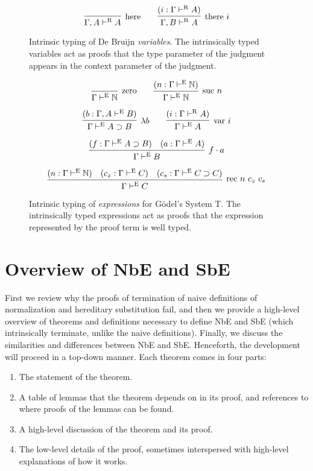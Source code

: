 \documentclass[runningheads,a4paper]{llncs}
\def\arr{\supset}
\def\app{\cdot}
\def\lam{\lambda}
\def\nat{\mathbb{N}}
\newcommand{\turn}[1]{\vdash^\con{#1}}
\newcommand{\con}[1]{\textmd{#1}}
\newcommand{\fun}[1]{\textmd{#1}}
\newcommand{\type}[1]{\Gamma \turn{E} #1}
\newcommand{\ctype}[2]{\Gamma , #1 \turn{E} #2}
\newcommand{\typr}[1]{\Gamma \turn{R} #1}
\newcommand{\ctypr}[2]{\Gamma , #1 \turn{R} #2}
\begin{document}
\begin{figure}[t!]
\caption{
Intrinsic typing of De Bruijn \textit{variables}.
The intrinsically typed variables act as proofs that the type
parameter of the judgment appears in the context parameter of the
judgment.
}
$$
\infer
  [\con{here}]
  {\ctypr{A}{A}}
{
}
\qquad
\infer
  [\con{there} ~ i]
  {\ctypr{B}{A}}
{
  (i : \typr{A})
}
$$
\label{fig:typr}
\end{figure}

\begin{figure}[t!]
\caption{
Intrinsic typing of \textit{expressions} for G{\"o}del's System T. The
intrinsically typed expressions act as proofs that the expression
represented by the proof term is well typed.
}
$$
\infer
  [\con{zero}]
  {\type{\nat}}
{}
\qquad
\infer
  [\con{suc} ~ n]
  {\type{\nat}}
{
  (n : \type{\nat})
}
$$

$$
\infer
  [\lam b]
  {\type{A \arr B}}
{
  (b : \ctype{A}{B})
}
\qquad
\infer
  [\fun{var} ~ i]
  {\type{A}}
{
  (i : \typr{A})
}
$$

$$
\infer
  [f \app a]
  {\type{B}}
{
  (f : \type{A \arr B})
  &
  (a : \type{A})
}
$$

$$
\infer
  [\fun{rec} ~ n ~ c_z ~ c_s]
  {\type{C}}
{
  (n : \type{\nat})
  &
  (c_z : \type{C})
  &
  (c_s : \type{C \arr C})
}
$$
\label{fig:type}
\end{figure}

\section{Overview of NbE and SbE}
\label{sec:overview}

First we review why the proofs of termination of naive definitions of
normalization and hereditary substitution fail, and then we provide a
high-level overview of theorems and definitions necessary to define NbE
and SbE (which intrinsically terminate, unlike the naive definitions).
Finally, we discuss the similarities and differences between NbE and
SbE.
Henceforth, the development will proceed in a top-down manner.
Each theorem comes in four parts:

\begin{enumerate}
\item{The statement of the theorem.}
\item{A table of lemmas that the theorem depends on in its proof, and
  references to where proofs of the lemmas can be found.}
\item{A high-level discussion of the theorem and its proof.}
\item{The low-level details of the proof, sometimes interspersed with
  high-level explanations of how it works.}
\end{enumerate}
\end{document}
